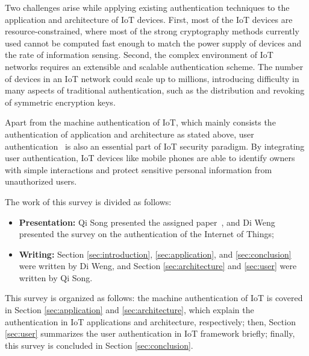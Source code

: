 Two challenges arise while applying existing authentication techniques to the application and architecture of IoT devices. First, most of the IoT devices are resource-constrained, where most of the strong cryptography methods currently used cannot be computed fast enough to match the power supply of devices and the rate of information sensing. Second, the complex environment of IoT networks requires an extensible and scalable authentication scheme. The number of devices in an IoT network could scale up to millions, introducing difficulty in many aspects of traditional authentication, such as the distribution and revoking of symmetric encryption keys.

Apart from the machine authentication of IoT, which mainly consists the authentication of application and architecture as stated above, user authentication~\cite{o2003comparing} is also an essential part of IoT security paradigm. By integrating user authentication, IoT devices like mobile phones are able to identify owners with simple interactions and protect sensitive personal information from unauthorized users.


The work of this survey is divided as follows:

\begin{itemize}
	\item \textbf{Presentation:} Qi Song presented the assigned paper~\cite{DBLP:journals/tifs/FrankBMMS13}, and Di Weng presented the survey on the authentication of the Internet of Things;
	\item \textbf{Writing:} Section \ref{sec:introduction}, \ref{sec:application}, and \ref{sec:conclusion} were written by Di Weng, and Section \ref{sec:architecture} and \ref{sec:user} were written by Qi Song.
\end{itemize}

This survey is organized as follows: the machine authentication of IoT is covered in Section \ref{sec:application} and \ref{sec:architecture}, which explain the authentication in IoT applications and architecture, respectively; then, Section \ref{sec:user} summarizes the user authentication in IoT framework briefly; finally, this survey is concluded in Section \ref{sec:conclusion}.